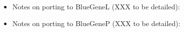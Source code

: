 \begin{itemize}
\item  Notes on porting to BlueGeneL (XXX to be detailed):


\item  Notes on porting to BlueGeneP (XXX to be detailed):

%
%
\end{itemize}
